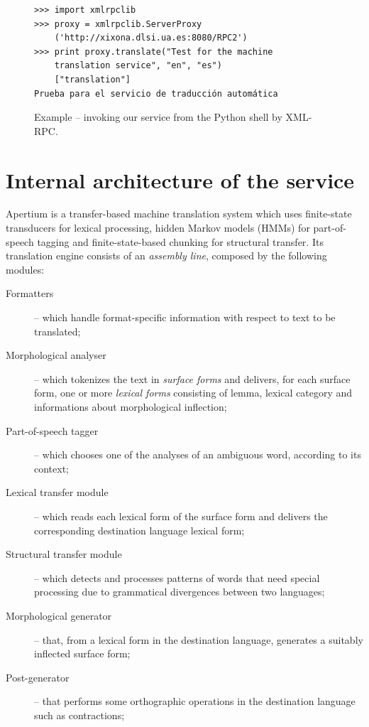 \documentclass[11pt]{article}
\begin{document}

\begin{figure}
 \begin{Verbatim}[frame=single, fontfamily=courier, fontsize=\scriptsize]
>>> import xmlrpclib
>>> proxy = xmlrpclib.ServerProxy
	('http://xixona.dlsi.ua.es:8080/RPC2')
>>> print proxy.translate("Test for the machine 
	translation service", "en", "es")
	["translation"]
Prueba para el servicio de traducción automática
 \end{Verbatim}
 \caption{Example -- invoking our service from the Python shell by XML-RPC.}
 \label{fig:pythoninv}
\end{figure}


\section{Internal architecture of the service}

Apertium is a transfer-based machine translation system which uses finite-state transducers for lexical processing, hidden Markov models (HMMs) for part-of-speech tagging and finite-state-based chunking for structural transfer. Its translation engine consists of an \emph{assembly line}, composed by the following modules:

\begin{description}
 \item[Formatters] -- which handle format-specific information with respect to text to be translated;
 \item[Morphological analyser] -- which tokenizes the text in \emph{surface forms} and delivers, for each surface form, one or more \emph{lexical forms} consisting of lemma, lexical category and informations about morphological inflection;
 \item[Part-of-speech tagger] -- which chooses one of the analyses of an ambiguous word, according to its context;
 \item[Lexical transfer module] -- which reads each lexical form of the surface form and delivers the corresponding destination language lexical form;
 \item[Structural transfer module] -- which detects and processes patterns of words that need special processing due to grammatical divergences between two languages;
 \item[Morphological generator] -- that, from a lexical form in the destination language, generates a suitably inflected surface form;
 \item[Post-generator] -- that performs some orthographic operations in the destination language such as contractions;
\end{description}
\end{document}
